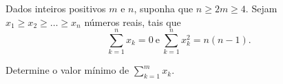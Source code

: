 Dados inteiros positivos $m$ e $n$, suponha que $n \ge 2m \ge 4$. Sejam $x_1 \ge x_2 \ge \dots \ge x_n$ números reais, tais que
\[ \sum_{k = 1}^n x_k = 0 \ \text{e} \ \sum_{k = 1}^n x_k^2 = n(n - 1).\]

Determine o valor mínimo de $\sum_{k = 1}^m x_k$.
